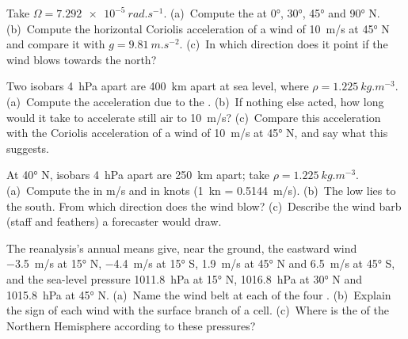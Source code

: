 \begin{exercise}[$\star$]\label{exo:b1:atmospheric-circulation:1}
Take $\Omega = \qty{7.292e-5}{rad.s^{-1}}$. (a)~Compute the  at
\ang{0}, \ang{30}, \ang{45} and \ang{90} N. (b)~Compute the horizontal Coriolis
acceleration of a wind of \qty{10}{m/s} at \ang{45} N and compare it with $g =
\qty{9.81}{m.s^{-2}}$. (c)~In which direction does it point if the wind blows
towards the north?
\end{exercise}

\begin{exercise}[$\star$]\label{exo:b1:atmospheric-circulation:2}
Two isobars \qty{4}{hPa} apart are \qty{400}{km} apart at sea level, where $\rho =
\qty{1.225}{kg.m^{-3}}$. (a)~Compute the acceleration due to the . (b)~If nothing else acted, how long would it take to accelerate still air to
\qty{10}{m/s}? (c)~Compare this acceleration with the Coriolis acceleration of a wind
of \qty{10}{m/s} at \ang{45} N, and say what this suggests.
\end{exercise}

\begin{exercise}[$\star$]\label{exo:b1:atmospheric-circulation:3}
At \ang{40} N, isobars \qty{4}{hPa} apart are \qty{250}{km} apart; take $\rho =
\qty{1.225}{kg.m^{-3}}$. (a)~Compute the  in \unit{m/s} and in knots
(\qty{1}{kn} = \qty{0.5144}{m/s}). (b)~The low lies to the south. From which
direction does the wind blow? (c)~Describe the wind barb (staff and feathers) a
forecaster would draw.
\end{exercise}

\begin{exercise}[$\star$]\label{exo:b1:atmospheric-circulation:4}
The reanalysis's annual means give, near the ground, the eastward wind
\qty{-3.5}{m/s} at \ang{15} N, \qty{-4.4}{m/s} at \ang{15} S, \qty{+1.9}{m/s} at
\ang{45} N and \qty{+6.5}{m/s} at \ang{45} S, and the sea-level pressure
\qty{1011.8}{hPa} at \ang{15} N, \qty{1016.8}{hPa} at \ang{30} N and
\qty{1015.8}{hPa} at \ang{45} N. (a)~Name the wind belt at each of the four .
(b)~Explain the sign of each wind with the surface branch of a cell. (c)~Where is the
 of the Northern Hemisphere according to these pressures?
\end{exercise}

